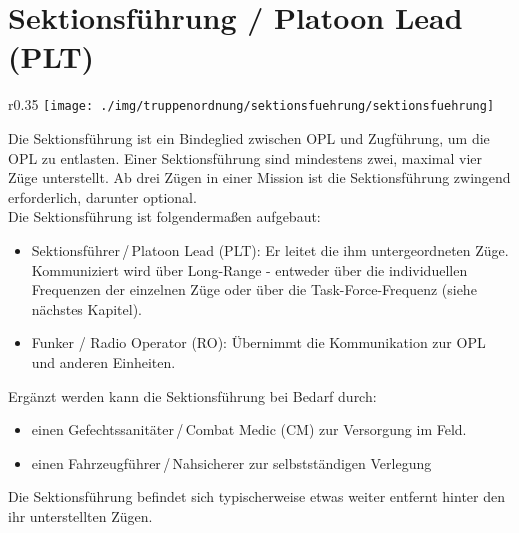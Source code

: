 \section{Sektionsführung / Platoon Lead (PLT)}
\begin{wrapfigure}{r}{0.35\textwidth}
	\vspace{-20pt}
	\centering 
	\texttt{[image: ./img/truppenordnung/sektionsfuehrung/sektionsfuehrung]}
	\vspace{-5pt}
\end{wrapfigure}	
Die Sektionsführung ist ein Bindeglied zwischen OPL und Zugführung, um die OPL zu entlasten. Einer Sektionsführung sind mindestens zwei, maximal vier Züge unterstellt. Ab drei Zügen in einer Mission ist die Sektionsführung zwingend erforderlich, darunter optional.\\

Die Sektionsführung ist folgendermaßen aufgebaut:
\begin{itemize}
	\item Sektionsführer\,/\,Platoon Lead (PLT): Er leitet die ihm untergeordneten Züge. Kommuniziert wird über Long-Range - entweder über die individuellen Frequenzen der einzelnen Züge oder über die Task-Force-Frequenz (siehe nächstes Kapitel).
	\item Funker / Radio Operator (RO): Übernimmt die Kommunikation zur OPL und anderen Einheiten.
\end{itemize}
Ergänzt werden kann die Sektionsführung bei Bedarf durch:
\begin{itemize}
	\setlength\itemsep{0em}
	\item einen Gefechtssanitäter\,/\,Combat Medic (CM) zur Versorgung im Feld.
	\item einen Fahrzeugführer\,/\,Nahsicherer zur selbstständigen Verlegung
\end{itemize} 
Die Sektionsführung befindet sich typischerweise etwas weiter entfernt hinter den ihr unterstellten Zügen.
